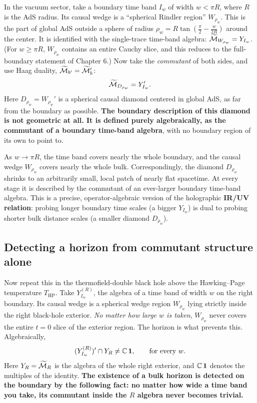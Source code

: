 In the vacuum sector, take a boundary time band $I_w$ of width $w<\pi R$, where $R$ is the AdS radius. Its
causal wedge is a ``spherical Rindler region'' $W_{\rho_w}$. This is the part of global AdS outside a sphere of
radius $\rho_w=R\tan(\tfrac\pi2-\tfrac w{2R})$ around the center. It is identified with the single-trace
time-band algebra: $\widetilde{\mathcal{M}}_{W_{\rho_w}}=Y_{I_w}$. (For $w\ge\pi R$, $W_{\rho_w}$ contains an entire Cauchy
slice, and this reduces to the full-boundary statement of Chapter 6.) Now take the \emph{commutant} of both
sides, and use Haag duality, $\widetilde{\mathcal{M}}_{b'}=\widetilde{\mathcal{M}}_b'$:
\[
\widetilde{\mathcal{M}}_{D_{\rho_w}} = Y_{I_w}' .
\]
Here $D_{\rho_w}=W_{\rho_w}'$ is a spherical causal diamond centered in global AdS, as far from the boundary as
possible. \textbf{The boundary description of this diamond is not geometric at all. It is defined purely
algebraically, as the commutant of a boundary time-band algebra}, with no boundary region of its own to point
to.

As $w\to\pi R$, the time band covers nearly the whole boundary, and the causal wedge $W_{\rho_w}$ covers nearly
the whole bulk. Correspondingly, the diamond $D_{\rho_w}$ shrinks to an arbitrarily small, local patch of nearly
flat spacetime. At every stage it is described by the commutant of an ever-larger boundary time-band algebra.
This is a precise, operator-algebraic version of the holographic \textbf{IR/UV relation}: probing longer
boundary time scales (a bigger $Y_{I_w}$) is dual to probing shorter bulk distance scales (a smaller diamond
$D_{\rho_w}$).

\subsection*{Detecting a horizon from commutant structure alone}

Now repeat this in the thermofield-double black hole above the Hawking--Page temperature $T_{\text{HP}}$. Take
$Y_{I_w}^{(R)}$, the algebra of a time band of width $w$ on the right boundary. Its causal wedge is a spherical
wedge region $W_{\rho_w}$ lying strictly inside the right black-hole exterior. \emph{No matter how large $w$ is
taken}, $W_{\rho_w}$ never covers the entire $t=0$ slice of the exterior region. The horizon is what prevents
this. Algebraically,
\begin{equation}
(Y_{I_w}^{(R)})' \cap Y_R \ne \mathbb{C}\,\mathbf{1}, \qquad \text{for every } w .
\label{eq:horizon_commutant}
\end{equation}
Here $Y_R=\widetilde{\mathcal{M}}_R$ is the algebra of the whole right exterior, and $\mathbb C\,\mathbf{1}$ denotes the multiples
of the identity. \textbf{The existence of a bulk horizon is detected on the boundary by the following fact: no
matter how wide a time band you take, its commutant inside the $R$ algebra never becomes trivial.}

